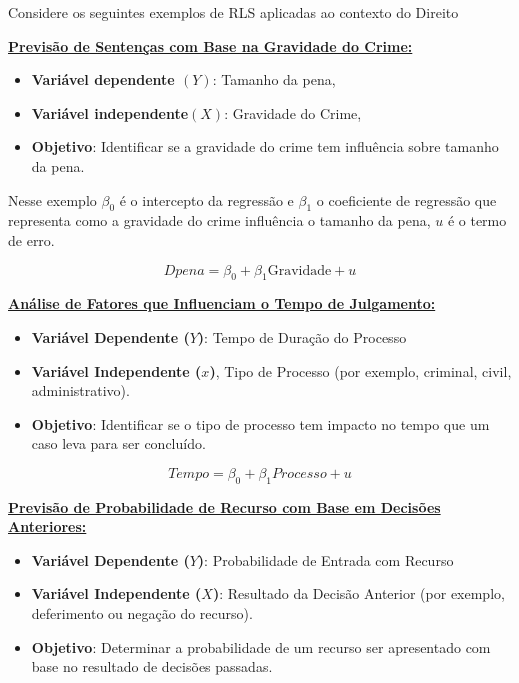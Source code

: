\documentclass[
  letterpaper,
  DIV=11,
  numbers=noendperiod]{scrreprt}
\providecommand{\tightlist}{%
  \setlength{\itemsep}{0pt}\setlength{\parskip}{0pt}}
\begin{document}
Considere os seguintes exemplos de RLS aplicadas ao contexto do Direito

\ul{\textbf{Previsão de Sentenças com Base na Gravidade do Crime:}}

\begin{itemize}
\tightlist
\item
  \textbf{Variável dependente \((Y)\)}: Tamanho da pena,
\item
  \textbf{Variável independente\((X)\)}: Gravidade do Crime,
\item
  \textbf{Objetivo}: Identificar se a gravidade do crime tem influência
  sobre tamanho da pena.
\end{itemize}

Nesse exemplo \(\beta_0\) é o intercepto da regressão e \(\beta_1\) o
coeficiente de regressão que representa como a gravidade do crime
influência o tamanho da pena, \(u\) é o termo de erro.

\[Dpena = \beta_0 + \beta_1{\text{Gravidade}} + u\]

\ul{\textbf{Análise de Fatores que Influenciam o Tempo de Julgamento:}}

\begin{itemize}
\tightlist
\item
  \textbf{Variável Dependente (\(Y\))}: Tempo de Duração do Processo
\item
  \textbf{Variável Independente (\(x\))}, Tipo de Processo (por exemplo,
  criminal, civil, administrativo).
\item
  \textbf{Objetivo}: Identificar se o tipo de processo tem impacto no
  tempo que um caso leva para ser concluído.
\end{itemize}

\[Tempo = \beta_0 + \beta_1  Processo  + u\]

\ul{\textbf{Previsão de Probabilidade de Recurso com Base em Decisões
Anteriores:}}

\begin{itemize}
\tightlist
\item
  \textbf{Variável Dependente (\(Y\))}: Probabilidade de Entrada com
  Recurso
\item
  \textbf{Variável Independente (\(X\))}: Resultado da Decisão Anterior
  (por exemplo, deferimento ou negação do recurso).
\item
  \textbf{Objetivo}: Determinar a probabilidade de um recurso ser
  apresentado com base no resultado de decisões passadas.
\end{itemize}
\end{document}
